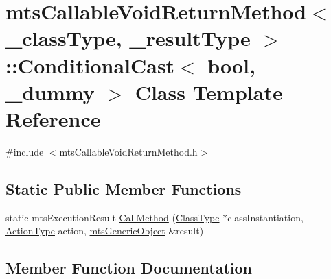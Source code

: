 \hypertarget{classmts_callable_void_return_method_1_1_conditional_cast}{}\section{mts\+Callable\+Void\+Return\+Method$<$ \+\_\+class\+Type, \+\_\+result\+Type $>$\+:\+:Conditional\+Cast$<$ bool, \+\_\+dummy $>$ Class Template Reference}
\label{classmts_callable_void_return_method_1_1_conditional_cast}


{\ttfamily \#include $<$mts\+Callable\+Void\+Return\+Method.\+h$>$}

\subsection*{Static Public Member Functions}
\begin{DoxyCompactItemize}
\item 
static mts\+Execution\+Result \hyperlink{classmts_callable_void_return_method_1_1_conditional_cast_a3b9e211ba1cf2392b29f29244fbeb95b}{Call\+Method} (\hyperlink{classmts_callable_void_return_method_a2bea77e5dd239ec2a1d3558dd3ca1776}{Class\+Type} $\ast$class\+Instantiation, \hyperlink{classmts_callable_void_return_method_a8fcdd120f008efea73b3d51cbb34f773}{Action\+Type} action, \hyperlink{classmts_generic_object}{mts\+Generic\+Object} \&result)
\end{DoxyCompactItemize}


\subsection{Member Function Documentation}
\hypertarget{classmts_callable_void_return_method_1_1_conditional_cast_a3b9e211ba1cf2392b29f29244fbeb95b}{}
